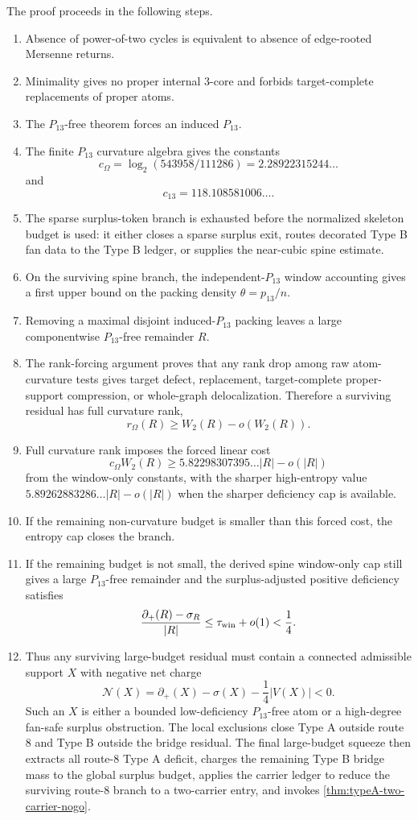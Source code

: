 \documentclass[11pt]{article}
\newcommand{\defp}{\partial_+}
\newcommand{\No}{\mathcal N}
\begin{document}
The proof proceeds in the following steps.
\begin{enumerate}[label=(\arabic*)]
\item Absence of power-of-two cycles is equivalent to absence of edge-rooted Mersenne returns.
\item Minimality gives no proper internal $3$-core and forbids target-complete replacements of proper atoms.
\item The $P_{13}$-free theorem forces an induced $P_{13}$.
\item The finite $P_{13}$ curvature algebra gives the constants
\[
 c_\Omega=\log_2(543958/111286)=2.28922315244\ldots
\]
and
\[
 c_{13}=118.108581006\ldots .
\]
\item The sparse surplus-token branch is exhausted before the normalized
skeleton budget is used: it either closes a sparse surplus exit, routes
decorated Type B fan data to the Type B ledger, or supplies the near-cubic
spine estimate.
\item On the surviving spine branch, the independent-$P_{13}$ window
accounting gives a first upper bound on the packing density $\theta=p_{13}/n$.
\item Removing a maximal disjoint induced-$P_{13}$ packing leaves a large componentwise $P_{13}$-free remainder $R$.
\item The rank-forcing argument proves that any rank drop among raw atom-curvature tests gives target defect, replacement, target-complete proper-support compression, or whole-graph delocalization.  Therefore a surviving residual has full curvature rank,
\[
 r_\Omega(R)\ge W_2(R)-o(W_2(R)).
\]
\item Full curvature rank imposes the forced linear cost
\[
 c_\Omega W_2(R)\ge 5.82298307395\ldots |R|-o(|R|)
\]
from the window-only constants, with the sharper high-entropy value
$5.89262883286\ldots |R|-o(|R|)$ when the sharper deficiency cap is available.
\item If the remaining non-curvature budget is smaller than this forced cost, the entropy cap closes the branch.
\item If the remaining budget is not small, the derived spine window-only cap
still gives a large $P_{13}$-free remainder and the surplus-adjusted positive
deficiency satisfies
\[
\frac{\defp(R)-\sigma_R}{|R|}\le \tau_{\rm win}+o(1)<\frac14.
\]
\item Thus any surviving large-budget residual must contain a connected admissible support $X$ with negative net charge
\[
\No(X)=\defp(X)-\sigma(X)-\frac14|V(X)|<0.
\]
Such an $X$ is either a bounded low-deficiency $P_{13}$-free atom or a
high-degree fan-safe surplus obstruction.  The local exclusions close Type A
outside route 8 and Type B outside the bridge residual.  The final large-budget
squeeze then extracts all route-8 Type A deficit, charges the remaining Type B
bridge mass to the global surplus budget, applies the carrier ledger to reduce
the surviving route-8 branch to a two-carrier entry, and invokes
\cref{thm:typeA-two-carrier-nogo}.
\end{enumerate}
\end{document}
